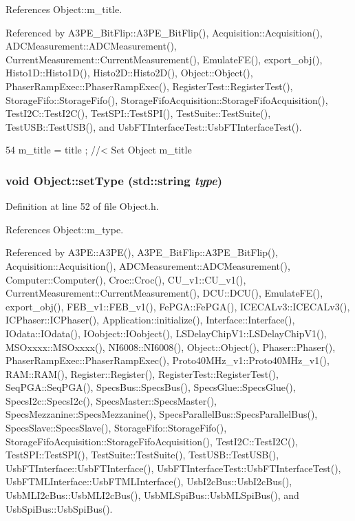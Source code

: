 References Object::m\_\-title.

Referenced by A3PE\_\-BitFlip::A3PE\_\-BitFlip(), Acquisition::Acquisition(), ADCMeasurement::ADCMeasurement(), CurrentMeasurement::CurrentMeasurement(), EmulateFE(), export\_\-obj(), Histo1D::Histo1D(), Histo2D::Histo2D(), Object::Object(), PhaserRampExec::PhaserRampExec(), RegisterTest::RegisterTest(), StorageFifo::StorageFifo(), StorageFifoAcquisition::StorageFifoAcquisition(), TestI2C::TestI2C(), TestSPI::TestSPI(), TestSuite::TestSuite(), TestUSB::TestUSB(), and UsbFTInterfaceTest::UsbFTInterfaceTest().


\begin{DoxyCode}
54 { m_title = title ; } //< Set Object m_title
\end{DoxyCode}
\hypertarget{classObject_aae534cc9d982bcb9b99fd505f2e103a5}{
\subsubsection[{setType}]{\setlength{\rightskip}{0pt plus 5cm}void Object::setType (std::string {\em type})}}
\label{classObject_aae534cc9d982bcb9b99fd505f2e103a5}


Definition at line 52 of file Object.h.

References Object::m\_\-type.

Referenced by A3PE::A3PE(), A3PE\_\-BitFlip::A3PE\_\-BitFlip(), Acquisition::Acquisition(), ADCMeasurement::ADCMeasurement(), Computer::Computer(), Croc::Croc(), CU\_\-v1::CU\_\-v1(), CurrentMeasurement::CurrentMeasurement(), DCU::DCU(), EmulateFE(), export\_\-obj(), FEB\_\-v1::FEB\_\-v1(), FePGA::FePGA(), ICECALv3::ICECALv3(), ICPhaser::ICPhaser(), Application::initialize(), Interface::Interface(), IOdata::IOdata(), IOobject::IOobject(), LSDelayChipV1::LSDelayChipV1(), MSOxxxx::MSOxxxx(), NI6008::NI6008(), Object::Object(), Phaser::Phaser(), PhaserRampExec::PhaserRampExec(), Proto40MHz\_\-v1::Proto40MHz\_\-v1(), RAM::RAM(), Register::Register(), RegisterTest::RegisterTest(), SeqPGA::SeqPGA(), SpecsBus::SpecsBus(), SpecsGlue::SpecsGlue(), SpecsI2c::SpecsI2c(), SpecsMaster::SpecsMaster(), SpecsMezzanine::SpecsMezzanine(), SpecsParallelBus::SpecsParallelBus(), SpecsSlave::SpecsSlave(), StorageFifo::StorageFifo(), StorageFifoAcquisition::StorageFifoAcquisition(), TestI2C::TestI2C(), TestSPI::TestSPI(), TestSuite::TestSuite(), TestUSB::TestUSB(), UsbFTInterface::UsbFTInterface(), UsbFTInterfaceTest::UsbFTInterfaceTest(), UsbFTMLInterface::UsbFTMLInterface(), UsbI2cBus::UsbI2cBus(), UsbMLI2cBus::UsbMLI2cBus(), UsbMLSpiBus::UsbMLSpiBus(), and UsbSpiBus::UsbSpiBus().


